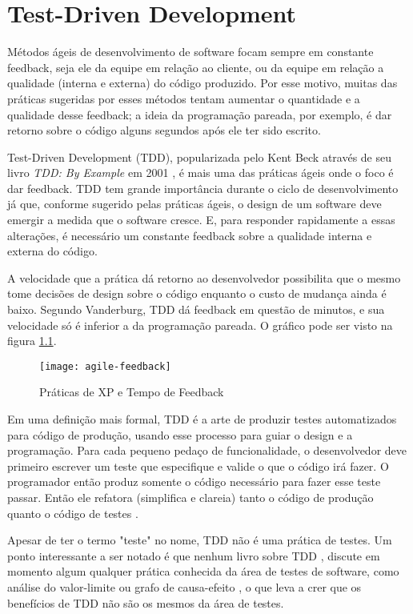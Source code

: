 \chapter{Test-Driven Development}
\label{cap:tdd}

Métodos ágeis de desenvolvimento de software focam sempre em constante
feedback, seja ele da equipe em relação ao cliente, ou da equipe em relação a
qualidade (interna e externa) do código produzido. Por esse motivo, muitas das
práticas sugeridas por esses métodos tentam aumentar o quantidade e a qualidade
desse feedback; a ideia da programação pareada, por exemplo, é dar retorno
sobre o código alguns segundos após ele ter sido escrito.

Test-Driven Development (TDD), popularizada pelo Kent Beck através de seu livro
\textit{TDD: By Example} em 2001 \cite{TDDByExample}, é mais uma das práticas
ágeis onde o foco é dar feedback. TDD tem grande importância durante o ciclo de
desenvolvimento já que, conforme sugerido pelas práticas ágeis, o design de um
software deve emergir a medida que o software cresce. E, para responder
rapidamente a essas alterações, é necessário um constante feedback sobre a
qualidade interna e externa do código.

A velocidade que a prática dá retorno ao desenvolvedor possibilita que o mesmo
tome decisões de design sobre o código enquanto o custo de mudança ainda é
baixo. Segundo Vanderburg, TDD dá feedback em questão de minutos, e sua
velocidade só é inferior a da programação pareada. O gráfico pode ser visto na
figura \ref{fig:agile-feedback}.

\begin{figure}
  \centering
  \texttt{[image: agile-feedback]}
  \caption{Práticas de XP e Tempo de Feedback}
  \label{fig:agile-feedback}
\end{figure}

Em uma definição mais formal, TDD é a arte de produzir testes automatizados para
código de produção, usando esse processo para guiar o design e a programação.
Para cada pequeno pedaço de funcionalidade, o desenvolvedor deve primeiro
escrever um teste que especifique e valide o que o código irá fazer. O
programador então produz somente o código necessário para fazer esse teste
passar. Então ele refatora (simplifica e clareia) tanto o código de produção
quanto o código de testes \cite{agilealliance-tdd} \cite{tdd-taxonomy}.

Apesar de ter o termo "teste" no nome, TDD não é uma prática de testes.
Um ponto interessante a ser notado é que nenhum livro sobre TDD \cite{GOOS}
\cite{TDDByExample} \cite{astels-tdd}, discute em momento algum qualquer
prática conhecida da área de testes de software, como análise do valor-limite ou
grafo de causa-efeito \cite{art-of-sw-testing}, o que leva a crer que os
benefícios de TDD não são os mesmos da área de testes.

